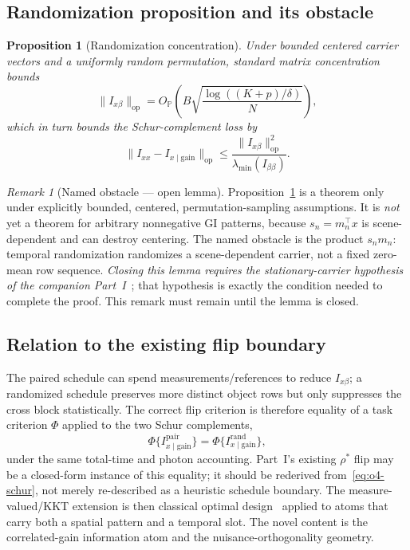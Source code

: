 \documentclass[11pt]{article}
\newtheorem{proposition}{Proposition}
\theoremstyle{remark}
\newtheorem{remark}{Remark}
\begin{document}
\subsection{Randomization proposition and its obstacle}
\label{sec:o4-randprop}
\begin{proposition}[Randomization concentration]
\label{prop:rand}
Under bounded centered carrier vectors and a uniformly random permutation,
standard matrix concentration bounds
\begin{equation*}
\| I_{x\beta} \|_{\mathrm{op}}
= O_{\mathbb P}\!\left( B\sqrt{ \frac{\log((K+p)/\delta)}{N} } \right),
\end{equation*}
which in turn bounds the Schur-complement loss by
\begin{equation*}
\| I_{xx} - I_{x\mid\mathrm{gain}} \|_{\mathrm{op}}
\le \frac{ \| I_{x\beta} \|_{\mathrm{op}}^2 }{ \lambda_{\min}(I_{\beta\beta}) }.
\end{equation*}
\end{proposition}

\begin{remark}[Named obstacle --- open lemma]
\label{rem:rand-obstacle}
Proposition~\ref{prop:rand} is a theorem only under explicitly bounded,
centered, permutation-sampling assumptions. It is \emph{not} yet a theorem for
arbitrary nonnegative GI patterns, because $s_n = m_n^\top x$ is scene-dependent
and can destroy centering. The named obstacle is the product $s_n m_n$: temporal
randomization randomizes a scene-dependent carrier, not a fixed zero-mean row
sequence. \emph{Closing this lemma requires the stationary-carrier hypothesis of
the companion Part~I}~\cite{companion}; that hypothesis is exactly the condition
needed to complete the proof. This remark must remain until the lemma is closed.
\end{remark}

\subsection{Relation to the existing flip boundary}
\label{sec:o4-flip}
The paired schedule can spend measurements/references to reduce $I_{x\beta}$; a
randomized schedule preserves more distinct object rows but only suppresses the
cross block statistically. The correct flip criterion is therefore equality of a
task criterion $\Phi$ applied to the two Schur complements,
\begin{equation}
\Phi\{ I_{x\mid\mathrm{gain}}^{\mathrm{pair}} \}
= \Phi\{ I_{x\mid\mathrm{gain}}^{\mathrm{rand}} \},
\tag{O4.5}\label{eq:o4-flip}
\end{equation}
under the same total-time and photon accounting. Part~I's existing $\rho^*$ flip
may be a closed-form instance of this equality; it should be rederived
from~\eqref{eq:o4-schur}, not merely re-described as a heuristic schedule
boundary. The measure-valued/KKT extension is then classical optimal
design~\cite{pukelsheim2006,dette1997,imhofwong2000} applied to atoms that carry
both a spatial pattern and a temporal slot. The novel content is the
correlated-gain information atom and the nuisance-orthogonality geometry.
\end{document}
